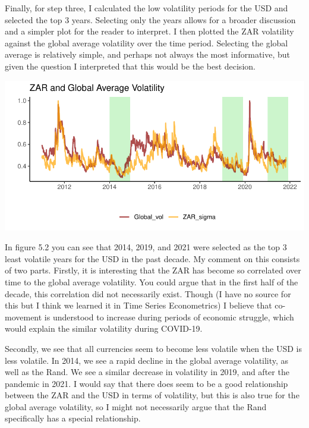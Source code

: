 \documentclass[11pt,preprint, authoryear]{elsarticle}
\let\origfigure\figure
\let\endorigfigure\endfigure
\renewenvironment{figure}[1][2] {
    \expandafter\origfigure\expandafter[H]
} {
    \endorigfigure
}
\numberwithin{equation}{section}
\numberwithin{figure}{section}
\numberwithin{table}{section}
\begin{document}
Finally, for step three, I calculated the low volatility periods for the
USD and selected the top 3 years. Selecting only the years allows for a
broader discussion and a simpler plot for the reader to interpret. I
then plotted the ZAR volatility against the global average volatility
over the time period. Selecting the global average is relatively simple,
and perhaps not always the most informative, but given the question I
interpreted that this would be the best decision.

\begin{figure}[H]

{\centering \includegraphics{Question-5_files/figure-latex/unnamed-chunk-4-1} 

}

\caption{ \label{Figure5.2}}\label{fig:unnamed-chunk-4}
\end{figure}

In figure 5.2 you can see that 2014, 2019, and 2021 were selected as the
top 3 least volatile years for the USD in the past decade. My comment on
this consists of two parts. Firstly, it is interesting that the ZAR has
become so correlated over time to the global average volatility. You
could argue that in the first half of the decade, this correlation did
not necessarily exist. Though (I have no source for this but I think we
learned it in Time Series Econometrics) I believe that co-movement is
understood to increase during periods of economic struggle, which would
explain the similar volatility during COVID-19.

Secondly, we see that all currencies seem to become less volatile when
the USD is less volatile. In 2014, we see a rapid decline in the global
average volatility, as well as the Rand. We see a similar decrease in
volatility in 2019, and after the pandemic in 2021. I would say that
there does seem to be a good relationship between the ZAR and the USD in
terms of volatility, but this is also true for the global average
volatility, so I might not necessarily argue that the Rand specifically
has a special relationship.


\end{document}
